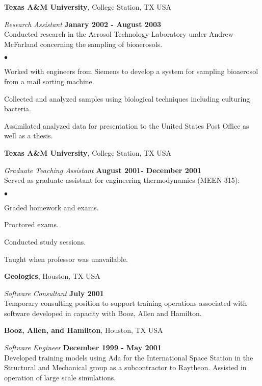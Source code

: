 \documentclass[margin,line]{res}
\newenvironment{list2}{
  \begin{list}{$\bullet$}{%
      \setlength{\itemsep}{0in}
      \setlength{\parsep}{0in} \setlength{\parskip}{0in}
      \setlength{\topsep}{0in} \setlength{\partopsep}{0in} 
      \setlength{\leftmargin}{0.2in}}}{\end{list}}
\begin{document}
\begin{resume}
{\bf Texas A\&M University}, College Station, TX USA

\vspace{-.3cm}
{\em Research Assistant} \hfill {\bf Janary 2002 - August 2003}\\
Conducted research in the Aerosol Technology Laboratory under Andrew McFarland concerning the sampling of bioaerosols.
\vspace*{.05in} 
\begin{list2}
\item Worked with engineers from Siemens to develop a system for sampling bioaerosol from a mail sorting machine.
\item Collected and analyzed samples using biological techniques including culturing bacteria.
\item Assimilated analyzed data for presentation to the United States Post Office as well as a thesis.
\end{list2} 


{\bf Texas A\&M University}, College Station, TX USA

\vspace{-.3cm}
{\em Graduate Teaching Assistant} \hfill {\bf August 2001- December 2001}\\
Served as graduate assistant for engineering thermodynamics (MEEN 315):
\vspace*{.05in} 
\begin{list2}
\item Graded homework and exams.
\item Proctored exams.
\item Conducted study sessions.
\item Taught when professor was unavailable.
\end{list2}


{\bf Geologics}, Houston, TX USA

\vspace{-.3cm}
{\em Software Consultant} \hfill {\bf July 2001}\\
Temporary consulting position to support training operations associated with software developed in capacity with Booz, Allen and Hamilton.


{\bf Booz, Allen, and Hamilton}, Houston, TX USA

\vspace{-.3cm}
{\em Software Engineer} \hfill {\bf December 1999 - May 2001}\\
Developed training models using Ada for the International Space Station in the Structural and Mechanical group as a subcontractor to Raytheon.  Assisted in operation of large scale simulations.


\end{resume}
\end{document}
